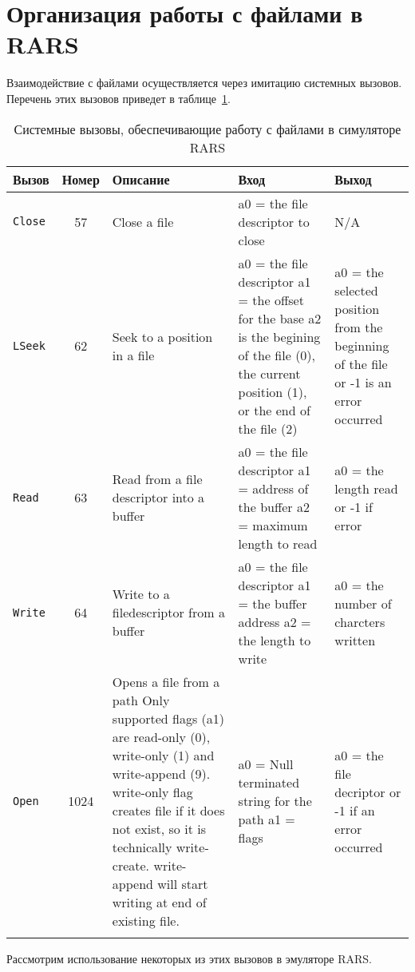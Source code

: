 \section{Организация работы с файлами в RARS}

Взаимодействие с файлами осуществляется через имитацию системных вызовов. Перечень этих вызовов приведет в таблице~\ref{table-file-syscalls}.

\begin{table}[h]
    \caption{Системные вызовы, обеспечивающие работу с файлами в симуляторе RARS}
    \centering
    \begin{tabularx}{\textwidth}{|l|c|X|X|X|}
        \hline
        \textbf{Вызов} & \textbf{Номер} & \textbf{Описание} & \textbf{Вход} & \textbf{Выход}\\
        \hline \verb|Close| & 57 & Close a file & a0 = the file descriptor to close & N/A \\
        \hline \verb|LSeek| & 62 & Seek to a position in a file & a0 = the file descriptor a1 = the offset for the base a2 is the begining of the file (0), the current position (1), or the end of the file (2) & a0 = the selected position from the beginning of the file or -1 is an error occurred \\
        \hline \verb|Read| & 63 & Read from a file descriptor into a buffer & a0 = the file descriptor a1 = address of the buffer a2 = maximum length to read & a0 = the length read or -1 if error \\
        \hline \verb|Write| & 64 & Write to a filedescriptor from a buffer & a0 = the file descriptor a1 = the buffer address a2 = the length to write & a0 = the number of charcters written \\
        \hline \verb|Open| & 1024 & Opens a file from a path Only supported flags (a1) are read-only (0), write-only (1) and write-append (9). write-only flag creates file if it does not exist, so it is technically write-create. write-append will start writing at end of existing file. & a0 = Null terminated string for the path a1 = flags & a0 = the file decriptor or -1 if an error occurred \\
        \hline \verb|| &  &  &  & \\
        \hline
    \end{tabularx}
    \label{table-file-syscalls}
\end{table}
Рассмотрим использование некоторых из этих вызовов в эмуляторе RARS.

